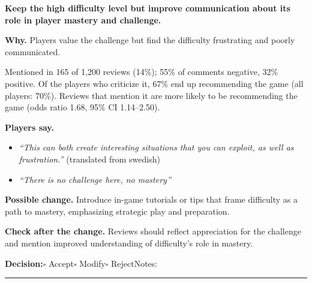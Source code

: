 \documentclass[10pt]{article}
\begin{document}
\begin{tcolorbox}[colback=white,colframe=gA,colbacktitle=lA,coltitle=black,title={\textbf{A2}\quad Overall Difficulty and Mastery\hfill\textcolor{gA}{\textbf{Accepted friction}}},boxrule=0.8pt,arc=2pt,left=6pt,right=6pt,top=4pt,bottom=4pt,before skip=8pt,after skip=8pt]
{\large\textbf{Keep the high difficulty level but improve communication about its role in player mastery and challenge.}}

\smallskip
\textbf{Why.} Players value the challenge but find the difficulty frustrating and poorly communicated.

\smallskip
{\small Mentioned in 165 of 1,200 reviews (14\%); 55\% of comments negative, 32\% positive. Of the players who criticize it, 67\% end up recommending the game (all players: 70\%). Reviews that mention it are more likely to be recommending the game {\color{ink2}\footnotesize(odds ratio 1.68, 95\% CI 1.14--2.50)}.}

\smallskip
\textbf{Players say.}
\begin{itemize}[leftmargin=12pt,itemsep=1pt,topsep=2pt]
    \item \textit{``This can both create interesting situations that you can exploit, as well as frustration.''} {\footnotesize(translated from swedish)}
    \item \textit{``There is no challenge here, no mastery''}
\end{itemize}
\textbf{Possible change.} Introduce in-game tutorials or tips that frame difficulty as a path to mastery, emphasizing strategic play and preparation.

\smallskip
\textbf{Check after the change.} Reviews should reflect appreciation for the challenge and mention improved understanding of difficulty's role in mastery.

\medskip
{\small\textbf{Decision:}\quad $\square$ Accept\quad $\square$ Modify\quad $\square$ Reject\qquad Notes: \rule{0.38\linewidth}{0.4pt}}
\end{tcolorbox}
\end{document}

